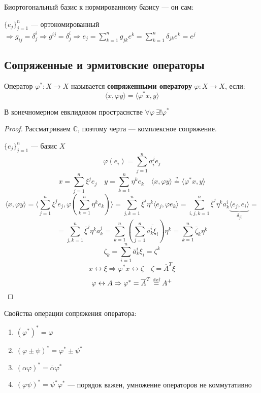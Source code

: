 \begin{remark}
    Биортогональный базис к нормированному базису --- он сам:

    $\{e_j\}_{j=1}^n$ --- ортономированный $\Rightarrow g_{ij}=\delta^i_j \Rightarrow g^{ij} = \delta^i_j \Rightarrow e_j=\sum_{k=1}^n g_{jk}e^k = \sum_{k=1}^n \delta_{jk} e^k = e^j$
\end{remark}

\subsection{Сопряженные и эрмитовские операторы}

\begin{definition}
    Оператор $\varphi^* : X \to X$ называется \textbf{сопряженными оператору} $\varphi : X \to X$, если: $$\langle x, \varphi y \rangle = \langle \varphi^* x , y \rangle$$
\end{definition}

\begin{theorem}
    В конечномерном евклидовом простраснстве $\forall \varphi \ \exists! \varphi^*$
\end{theorem}
\begin{proof}
    Рассматриваем $\mathbb{C}$, поэтому черта --- комплексное сопряжение.

    $\{e_j\}_{j=1}^n$ --- базис $X$
    $$\varphi(e_i) = \sum_{j=1}^n a_i^j e_j$$
    $$x = \sum_{j=1}^n \xi^j e_j \quad y = \sum_{k=1}^n \eta^k e_k \quad \langle x , \varphi y\rangle \stackrel{?}{=} \langle \varphi^* x, y \rangle$$
    $$\langle x, \varphi y \rangle = \langle \sum_{j=1}^n \xi^j e_j, \varphi\left(\sum_{k=1}^n \eta^k e_k\right)\rangle = \sum_{j,k=1}^n \overline \xi^j \eta^k \langle e_j, \varphi e_k\rangle = \sum_{i,j,k=1}^n \overline \xi^j \eta^k a_k^i \underbrace{\langle e_j, e_i\rangle}_{\delta_{ji}}=$$
    $$=\sum_{j,k=1}^n \overline\xi^j \eta^k a_k^j = \sum_{k=1}^n \left(\sum_{j=1}^n \overline{\overline a_k^i \xi_i }\right)\eta^k=\sum_{k=1}^n \overline \zeta_k\eta^k$$
    $$\zeta_k = \sum_{i=1}^n \overline a_k^i \xi_i = \zeta^k$$
    $$x\leftrightarrow \xi \Rightarrow \varphi^* x \leftrightarrow \zeta \quad \zeta = \overline A^T \xi$$
    $$\varphi \leftrightarrow A \Rightarrow \varphi^* = \overline A^T \stackrel{\text{def}}{=} A^+$$
\end{proof}

Свойства операции сопряжения оператора:
\begin{enumerate}
    \item $(\varphi^*)^* = \varphi$
    \item $(\varphi\pm\psi)^*=\varphi^*\pm\psi^*$
    \item $(\alpha \varphi)^* = \overline \alpha \varphi^*$
    \item $(\varphi\psi)^* = \psi^*\varphi^*$ --- порядок важен, умножение операторов не коммутативно
\end{enumerate}

